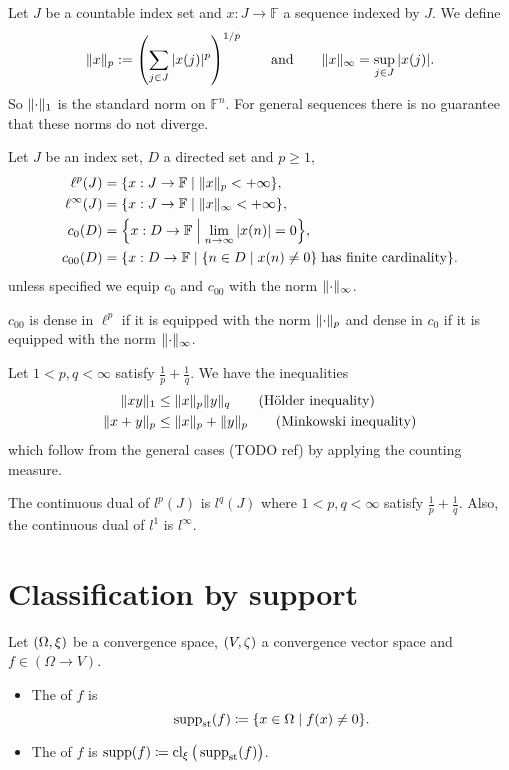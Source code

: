 Let $J$ be a countable index set and $x:J\to \mathbb{F}$ a sequence indexed by $J$. We define
\[ \lVert x\rVert_p := \left(\sum_{j\in J}|x(j)|^p\right)^{1/p} \qquad\text{and}\qquad \lVert x\rVert_\infty = \sup_{j\in J}|x(j)|. \]
So $\lVert\cdot\rVert_1$ is the standard norm on $\mathbb{F}^n$. For general sequences there is no guarantee that these norms do not diverge.
\begin{definition}
Let $J$ be an index set, $D$ a directed set and $p\geq 1$,
\begin{align*}
\ell^p(J) &= \setbuilder{x:J\to \F}{\norm{x}_p < +\infty},\\
\ell^\infty(J) &= \setbuilder{x:J\to \F}{\norm{x}_\infty < +\infty},\\
c_0(D) &= \setbuilder{x:D\to \F}{\lim_{n\to\infty}|x(n)| = 0}, \\
c_{00}(D) &= \setbuilder{x:D\to \F}{\setbuilder{n\in D}{x(n)\neq 0}\;\text{has finite cardinality}}.
\end{align*}
unless specified we equip $c_0$ and $c_{00}$ with the norm $\lVert\cdot\rVert_\infty$.
\end{definition}

\begin{lemma}
$c_{00}$ is dense in $\ell^p$ if it is equipped with the norm $\lVert\cdot\rVert_p$ and dense in $c_0$ if it is equipped with the norm $\lVert\cdot\rVert_\infty$.
\end{lemma}

Let $1<p,q<\infty$ satisfy $\frac{1}{p}+\frac{1}{q}$. We have the inequalities
\begin{align*}
\lVert xy\rVert_1 &\leq \lVert x\rVert_p\lVert y\rVert_q\qquad\text{(Hölder inequality)} \\
\lVert x+y\rVert_p &\leq \lVert x\rVert_p+\lVert y\rVert_p\qquad\text{(Minkowski inequality)}
\end{align*}
which follow from the general cases (TODO ref) by applying the counting measure.

\begin{proposition}
The continuous dual of $l^p(J)$ is $l^q(J)$ where $1<p,q<\infty$ satisfy $\frac{1}{p}+\frac{1}{q}$.
Also, the continuous dual of $l^1$ is $l^\infty$.
\end{proposition}



\section{Classification by support}
\begin{definition}
Let $\sSet{\Omega, \xi}$ be a convergence space, $\sSet{V,\zeta}$ a convergence vector space and $f\in (\Omega\to V)$.
\begin{itemize}
\item The  of $f$ is
\[ \supp_\text{st}(f) \defeq \setbuilder{x\in \Omega}{f(x) \neq 0}. \]
\item The  of $f$ is $\operatorname{supp}(f) \coloneqq \operatorname{cl}_\xi\big(\operatorname{supp}_\text{st}(f)\big)$.
\end{itemize}
\end{definition}

